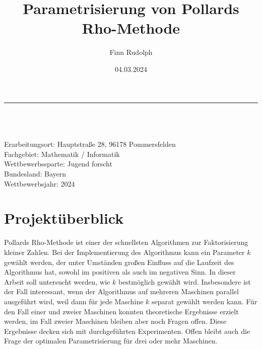 \documentclass[a4paper, 11pt, ngerman]{article}
\title{Parametrisierung von Pollards Rho-Methode}
\author{Finn Rudolph}
\date{04.03.2024}
\theoremstyle{definition}
\theoremstyle{plain}
\theoremstyle{remark}
\begin{document}
\begin{titlepage}

    \noindent\rule{\textwidth}{0.4pt}

    \makeatletter
    \begin{flushleft}
        \textbf{\LARGE{\@title}} \\
        \vspace{1.5em}
        \@author \\
        \@date \\
        \vspace{1em}
        Erarbeitungsort: Hauptstraße 28, 96178 Pommersfelden \\
        Fachgebiet: Mathematik / Informatik \\
        Wettbewerbssparte: Jugend forscht \\
        Bundesland: Bayern \\
        Wettbewerbsjahr: 2024
    \end{flushleft}

    \vspace{0.2em}

    \section*{Projektüberblick}

    Pollards Rho-Methode ist einer der schnellsten Algorithmen zur Faktorisierung kleiner Zahlen. Bei der Implementierung des Algorithmus kann ein Parameter $k$ gewählt werden, der unter Umständen großen Einfluss auf die Laufzeit des Algorithmus hat, sowohl im positiven als auch im negativen Sinn. In dieser Arbeit soll untersucht werden, wie $k$ bestmöglich gewählt wird. Insbesondere ist der Fall interessant, wenn der Algorithmus auf mehreren Maschinen parallel ausgeführt wird, weil dann für jede Maschine $k$ separat gewählt werden kann. Für den Fall einer und zweier Maschinen konnten theoretische Ergebnisse erzielt werden, im Fall zweier Maschinen bleiben aber noch Fragen offen. Diese Ergebnisse decken sich mit durchgeführten Experimenten. Offen bleibt auch die Frage der optimalen Parametrisierung für drei oder mehr Maschinen.

    \vspace{0.5em}

    \begin{spacing}{1.2}
        \tableofcontents
    \end{spacing}

    \thispagestyle{empty}

\end{titlepage}
\end{document}

